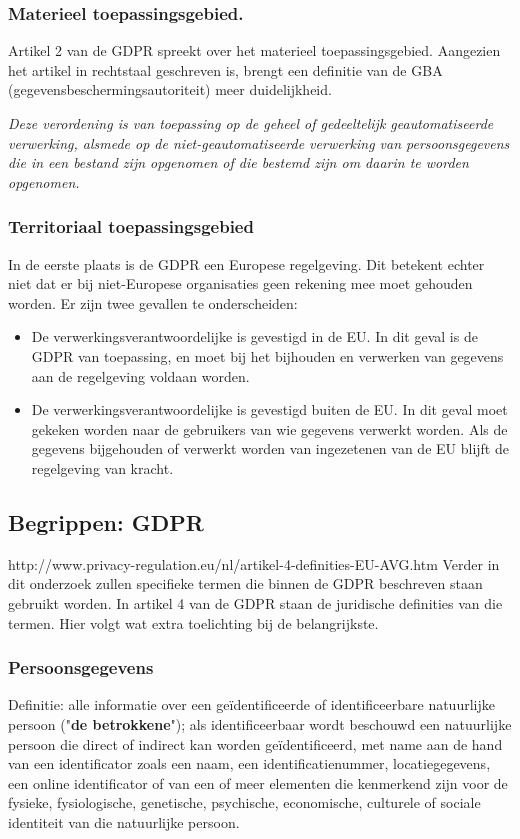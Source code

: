 \subsubsection{Materieel toepassingsgebied.}
Artikel 2 van de GDPR spreekt over het materieel toepassingsgebied. Aangezien het artikel in rechtstaal geschreven is, brengt een definitie van de GBA (gegevensbeschermingsautoriteit) meer duidelijkheid. 

\textit{Deze verordening is van toepassing op de geheel of gedeeltelijk geautomatiseerde verwerking, alsmede op de niet-geautomatiseerde verwerking van persoonsgegevens die in een bestand zijn opgenomen of die bestemd zijn om daarin te worden opgenomen.}

\subsubsection{Territoriaal toepassingsgebied}
In de eerste plaats is de GDPR een Europese regelgeving. Dit betekent echter niet dat er bij niet-Europese organisaties geen rekening mee moet gehouden worden. Er zijn twee gevallen te onderscheiden: 

\begin{itemize}
	\item De verwerkingsverantwoordelijke is gevestigd in de EU. 
	\subitem In dit geval is de GDPR van toepassing, en moet bij het bijhouden en verwerken van gegevens aan de regelgeving voldaan worden. 
	\item De verwerkingsverantwoordelijke is gevestigd buiten de EU. 
	\subitem In dit geval moet gekeken worden naar de gebruikers van wie gegevens verwerkt worden. Als de gegevens bijgehouden of verwerkt worden van ingezetenen van de EU blijft de regelgeving van kracht. 
\end{itemize}


\subsection{{Begrippen: GDPR}} 

http://www.privacy-regulation.eu/nl/artikel-4-definities-EU-AVG.htm
Verder in dit onderzoek zullen specifieke termen die binnen de GDPR beschreven staan gebruikt worden.
In artikel 4 van de GDPR staan de juridische definities van die termen. Hier volgt wat extra toelichting bij de belangrijkste. 

\subsubsection{Persoonsgegevens} 
Definitie: alle informatie over een geïdentificeerde of identificeerbare natuurlijke persoon ("\textbf{de betrokkene}"); als identificeerbaar wordt beschouwd een natuurlijke persoon die direct of indirect kan worden geïdentificeerd, met name aan de hand van een identificator zoals een naam, een identificatienummer, locatiegegevens, een online identificator of van een of meer elementen die kenmerkend zijn voor de fysieke, fysiologische, genetische, psychische, economische, culturele of sociale identiteit van die natuurlijke persoon.

